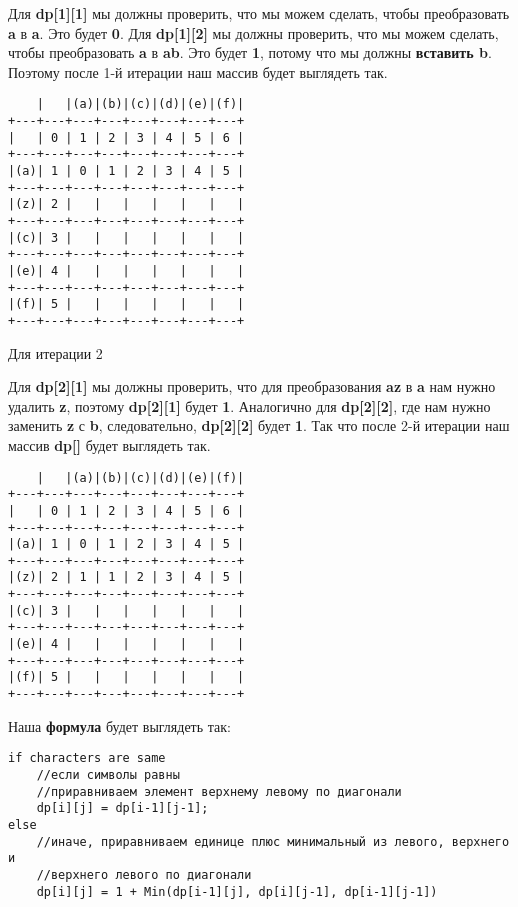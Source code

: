 \newpage

Для \textbf{dp[1][1]} мы должны проверить, что мы можем сделать, чтобы преобразовать \textbf{a} в \textbf{a}. Это будет \textbf{0}. Для \textbf{dp[1][2]} мы должны проверить, что мы можем сделать, чтобы преобразовать \textbf{a} в \textbf{ab}. Это будет \textbf{1}, потому что мы должны \textbf{вставить b}. Поэтому после 1-й итерации наш массив будет выглядеть так.

\begin{tcolorbox}
\begin{verbatim}
	|   |(a)|(b)|(c)|(d)|(e)|(f)|
+---+---+---+---+---+---+---+---+
|   | 0 | 1 | 2 | 3 | 4 | 5 | 6 |
+---+---+---+---+---+---+---+---+
|(a)| 1 | 0 | 1 | 2 | 3 | 4 | 5 |
+---+---+---+---+---+---+---+---+
|(z)| 2 |   |   |   |   |   |   |
+---+---+---+---+---+---+---+---+
|(c)| 3 |   |   |   |   |   |   |
+---+---+---+---+---+---+---+---+
|(e)| 4 |   |   |   |   |   |   |
+---+---+---+---+---+---+---+---+
|(f)| 5 |   |   |   |   |   |   |
+---+---+---+---+---+---+---+---+
\end{verbatim}
\end{tcolorbox}

Для итерации 2

\vspace{\baselineskip}

Для \textbf{dp[2][1]} мы должны проверить, что для преобразования \textbf{az} в \textbf{a} нам нужно удалить \textbf{z}, поэтому \textbf{dp[2][1]} будет \textbf{1}. Аналогично для \textbf{dp[2][2]}, где нам нужно заменить \textbf{z} с \textbf{b}, следовательно, \textbf{dp[2][2]} будет \textbf{1}. Так что после 2-й итерации наш массив \textbf{dp[]} будет выглядеть так.

\begin{tcolorbox}
\begin{verbatim}
    |   |(a)|(b)|(c)|(d)|(e)|(f)|
+---+---+---+---+---+---+---+---+
|   | 0 | 1 | 2 | 3 | 4 | 5 | 6 |
+---+---+---+---+---+---+---+---+
|(a)| 1 | 0 | 1 | 2 | 3 | 4 | 5 |
+---+---+---+---+---+---+---+---+
|(z)| 2 | 1 | 1 | 2 | 3 | 4 | 5 |
+---+---+---+---+---+---+---+---+
|(c)| 3 |   |   |   |   |   |   |
+---+---+---+---+---+---+---+---+
|(e)| 4 |   |   |   |   |   |   |
+---+---+---+---+---+---+---+---+
|(f)| 5 |   |   |   |   |   |   |
+---+---+---+---+---+---+---+---+
\end{verbatim}
\end{tcolorbox}

Наша \textbf{формула} будет выглядеть так:

\begin{tcolorbox}
\begin{verbatim}
if characters are same
	//если символы равны
	//приравниваем элемент верхнему левому по диагонали
	dp[i][j] = dp[i-1][j-1];
else
	//иначе, приравниваем единице плюс минимальный из левого, верхнего и 
	//верхнего левого по диагонали
	dp[i][j] = 1 + Min(dp[i-1][j], dp[i][j-1], dp[i-1][j-1])
\end{verbatim}
\end{tcolorbox}


